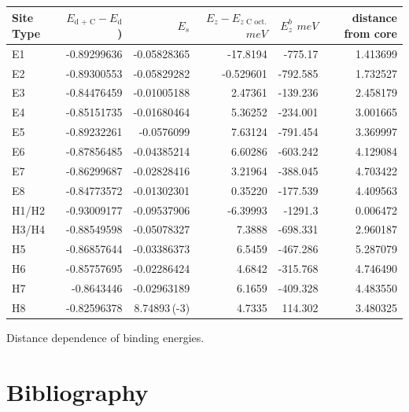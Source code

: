 \documentclass[a4paper]{apa6}
\begin{document}
\begin{center}
\begin{tabular}{lrrrrr}
Site Type & \(E_{\text{d + C}} - E_{\text{d}}\)) & \(E_s\) & \(E_z - E_{z\text{ C oct.}}\) \(meV\) & \(E^b_z\) \(meV\) & distance from core\\
\hline
E1 & -0.89299636 & -0.05828365 & -17.8194 & -775.17 & 1.413699\\
E2 & -0.89300553 & -0.05829282 & -0.529601 & -792.585 & 1.732527\\
E3 & -0.84476459 & -0.01005188 & 2.47361 & -139.236 & 2.458179\\
E4 & -0.85151735 & -0.01680464 & 5.36252 & -234.001 & 3.001665\\
E5 & -0.89232261 & -0.0576099 & 7.63124 & -791.454 & 3.369997\\
E6 & -0.87856485 & -0.04385214 & 6.60286 & -603.242 & 4.129084\\
E7 & -0.86299687 & -0.02828416 & 3.21964 & -388.045 & 4.703422\\
E8 & -0.84773572 & -0.01302301 & 0.35220 & -177.539 & 4.409563\\
H1/H2 & -0.93009177 & -0.09537906 & -6.39993 & -1291.3 & 0.006472\\
H3/H4 & -0.88549598 & -0.05078327 & 7.3888 & -698.331 & 2.960187\\
H5 & -0.86857644 & -0.03386373 & 6.5459 & -467.286 & 5.287079\\
H6 & -0.85757695 & -0.02286424 & 4.6842 & -315.768 & 4.746490\\
H7 & -0.8643446 & -0.02963189 & 6.1659 & -409.328 & 4.483550\\
H8 & -0.82596378 & 8.74893\,(-3) & 4.7335 & 114.302 & 3.480325\\
\end{tabular}
\end{center}



Distance dependence of binding energies. 




\section{Bibliography}
\label{sec:orgbe3e157}
\label{orgea8d8d5}



\end{document}
